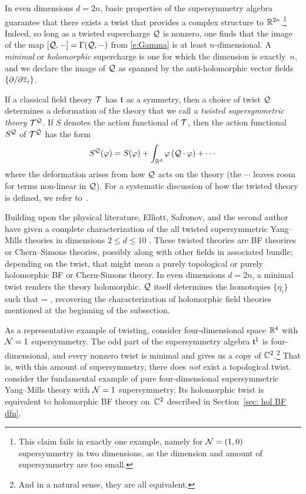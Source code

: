 \documentclass[11pt]{amsart}
\def\del{\partial}
\begin{document}
In even dimensions $d = 2n$, basic properties of the supersymmetry algebra guarantee that there exists a twist that provides a complex structure to $\mathbb R^{2n}$.\footnote{This claim fails in exactly one example, namely for $\mathcal N=(1,0)$ supersymmetry in two dimensions, as the dimension and amount of supersymmetry are too small.}
Indeed, so long as a twisted supercharge $\mathcal Q$ is nonzero, 
one finds that the image of the map $[\mathcal Q,-] = \Gamma(\mathcal Q,-)$ from \eqref{e:Gamma} is at least $n$-dimensional.
A {\em minimal} or {\em holomorphic} supercharge is one for which the dimension is exactly~$n$,
and we declare the image of $\mathcal Q$ as spanned by the anti-holomorphic vector fields~$\{\del / \del \zbar_i\}$. 

If a classical field theory $\mathcal T$ has $\mathfrak t$ as a symmetry, 
then a choice of twist $\mathcal Q$ determines a deformation of the theory that we call a {\em twisted supersymmetric theory} $\mathcal T^\mathcal Q$.
If $S$ denotes the action functional of $\mathcal T$, then the action functional $S^\mathcal Q$ of $\mathcal T^\mathcal Q$ has the form
\[
S^\mathcal Q(\varphi) = S(\varphi) + \int_{\mathbb R^d} \varphi  \left(\mathcal Q \cdot \varphi \right) + \cdots 
\]
where the deformation arises from how $\mathcal Q$ acts on the theory 
(the $\cdots$ leaves room for terms non-linear in $\mathcal Q$).
For a systematic discussion of how the twisted theory is defined, 
we refer to~\autocite{CostelloHolomorphic, ESW}. 

Building upon the physical literature, Elliott, Safronov, and the second author have given a complete characterization of the all twisted supersymmetric Yang--Mills theories in dimensions $2 \leq d \leq 10$ \autocite{ESW}. 
These twisted theories are BF theorires or Chern--Simons theories, possibly along with other fields in associated bundle; 
depending on the twist, that might mean a purely topological or purely holomorphic BF or Chern-Simons theory.
In even dimensions $d = 2n$, a minimal twist renders the theory holomorphic.
$\mathcal Q$ itself determines the homotopies $\{\eta_i\}$ such that 
\beqn
[\cQ,\eta_i] = \frac{\del}{\del \zbar_i} ,
\eeqn 
recovering the characterization of holomorphic field theories mentioned at the beginning of the subsection. 

As a representative example of twisting, 
consider four-dimensional space $\mathbb R^4$ with $\mathcal N=1$ supersymmetry.
The odd part of the supersymmetry algebra $\mathfrak t^1$ is four-dimensional, 
and every nonzero twist is minimal and gives us a copy of $\mathbb C^2$.\footnote{And in a natural sense, they are all equivalent.}
That is, with this amount of supersymmetry, there does {\it not} exist a topological twist.
consider the fundamental example of pure four-dimensional supersymmetric Yang--Mills theory with $\mathcal N=1$ supersymmetry. 
Its holomorphic twist is equivalent to holomorphic BF theory on~$\mathbb C^2$ described in Section~\ref{sec: hol BF dfn}.
\end{document}
